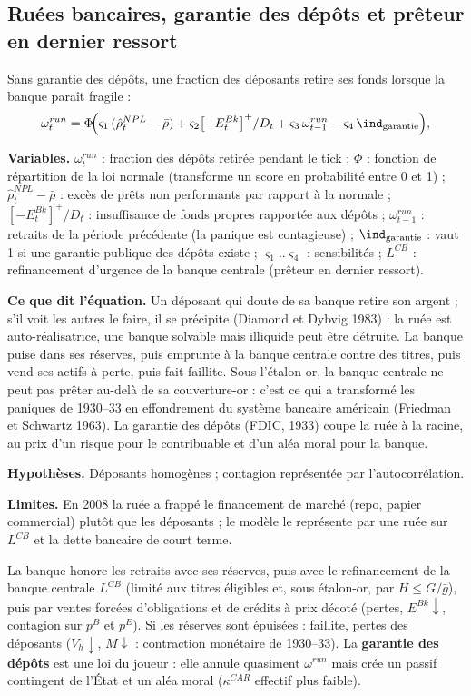 \documentclass[11pt,a4paper]{article}
\newcommand{\variables}{\par\noindent\textbf{Variables.} }
\newcommand{\sens}{\par\noindent\textbf{Ce que dit l'équation.} }
\newcommand{\hyp}{\par\noindent\textbf{Hypothèses.} }
\newcommand{\limites}{\par\noindent\textbf{Limites.} }
\newcommand{\pos}[1]{{\left[#1\right]^{+}}}
\begin{document}
\subsection{Ruées bancaires, garantie des dépôts et prêteur en dernier ressort}
\label{sec:run}
Sans garantie des dépôts, une fraction des déposants retire ses fonds lorsque la banque paraît fragile :
\begin{equation}
\omega^{run}_t = \Phi\!\Big(\varsigma_1\,(\hat\rho^{NPL}_t - \bar\rho) + \varsigma_2 \pos{-E^{Bk}_t}/D_t + \varsigma_3\, \omega^{run}_{t-1} - \varsigma_4\, \ind_{\text{garantie}}\Big),
\label{eq:run}
\end{equation}
\begin{lecture}
\variables $\omega^{run}_t$ : fraction des dépôts retirée pendant le tick ; $\Phi$ : fonction de répartition de la loi normale (transforme un score en probabilité entre 0 et 1) ; $\hat\rho^{NPL}_t-\bar\rho$ : excès de prêts non performants par rapport à la normale ; $\pos{-E^{Bk}_t}/D_t$ : insuffisance de fonds propres rapportée aux dépôts ; $\omega^{run}_{t-1}$ : retraits de la période précédente (la panique est contagieuse) ; $\ind_{\text{garantie}}$ : vaut 1 si une garantie publique des dépôts existe ; $\varsigma_1..\varsigma_4$ : sensibilités ; $L^{CB}$ : refinancement d'urgence de la banque centrale (prêteur en dernier ressort).
\sens Un déposant qui doute de sa banque retire son argent ; s'il voit les autres le faire, il se précipite (Diamond et Dybvig 1983) : la ruée est auto-réalisatrice, une banque solvable mais illiquide peut être détruite. La banque puise dans ses réserves, puis emprunte à la banque centrale contre des titres, puis vend ses actifs à perte, puis fait faillite. Sous l'étalon-or, la banque centrale ne peut pas prêter au-delà de sa couverture-or : c'est ce qui a transformé les paniques de 1930--33 en effondrement du système bancaire américain (Friedman et Schwartz 1963). La garantie des dépôts (FDIC, 1933) coupe la ruée à la racine, au prix d'un risque pour le contribuable et d'un aléa moral pour la banque.
\hyp Déposants homogènes ; contagion représentée par l'autocorrélation.
\limites En 2008 la ruée a frappé le financement de marché (repo, papier commercial) plutôt que les déposants ; le modèle le représente par une ruée sur $L^{CB}$ et la dette bancaire de court terme.
\end{lecture}
La banque honore les retraits avec ses réserves, puis avec le refinancement de la banque centrale $L^{CB}$ (limité aux titres éligibles et, sous étalon-or, par $H \le G/\bar g$), puis par ventes forcées d'obligations et de crédits à prix décoté (pertes, $E^{Bk}\downarrow$, contagion sur $p^B$ et $p^E$). Si les réserves sont épuisées : faillite, pertes des déposants ($V_h \downarrow$, $M \downarrow$ : contraction monétaire de 1930--33). La \textbf{garantie des dépôts} est une loi du joueur : elle annule quasiment $\omega^{run}$ mais crée un passif contingent de l'État et un aléa moral ($\kappa^{CAR}$ effectif plus faible).
\end{document}
